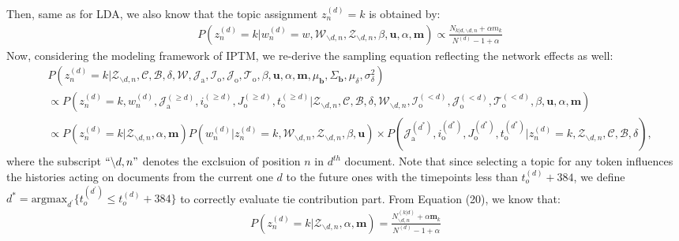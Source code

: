 \documentclass[a4paper]{article}
\begin{document}
     Then, same as for LDA, we also know that the topic assignment $z_n^{(d)}=k$ is obtained by:
     \begin{equation*}
     \begin{aligned}
     &P(z^{(d)}_n=k|w^{(d)}_n=w, \mathcal{W}_{\backslash d, n}, \mathcal{Z}_{\backslash d,n}, \beta, \boldsymbol{u}, \alpha, \boldsymbol{m}) \propto
     \frac{N_{k|d, \backslash d, n}+\alpha m_k}{N^{(d)}-1+\alpha}
     \end{aligned}
     \end{equation*}
     Now, considering the modeling framework of IPTM, we re-derive the sampling equation reflecting the network effects as well:
   \begin{equation}
   \begin{aligned} & 
   P(z^{(d)}_n=k|\mathcal{Z}_{\backslash d, n},   \mathcal{C},   \mathcal{B}, \delta, \mathcal{W},  \mathcal{J}_{\mbox{a}}, \mathcal{I}_{\mbox{o}}, \mathcal{J}_{\mbox{o}}, \mathcal{T}_{\mbox{o}}, \beta, \boldsymbol{u}, \alpha, \boldsymbol{m},  \mu_{\boldsymbol{b}}, \Sigma_{\boldsymbol{b}}, \mu_\delta, \sigma^2_\delta)\\
   & \propto P(z^{(d)}_n=k, w^{(d)}_n, \mathcal{J}^{(\geq d)}_{\mbox{a}}, i^{(\geq d)}_{\mbox{o}}, J^{(\geq d)}_{\mbox{o}}, t^{(\geq d)}_{\mbox{o}}|\mathcal{Z}_{\backslash d, n}, \mathcal{C},   \mathcal{B},\delta,\mathcal{W}_{\backslash d, n}, \mathcal{I}^{(<d)}_{\mbox{o}}, \mathcal{J}^{(<d)}_{\mbox{o}}, \mathcal{T}^{(<d)}_{\mbox{o}}, \beta, \boldsymbol{u}, \alpha, \boldsymbol{m})\\
   &\propto P(z^{(d)}_n=k|\mathcal{Z}_{\backslash d, n}, \alpha, \boldsymbol{m})P(w^{(d)}_n|z^{(d)}_n=k, \mathcal{W}_{\backslash d, n}, \mathcal{Z}_{\backslash d, n}, \beta, \boldsymbol{u} )\times P(\mathcal{J}^{(d ^*)}_{\mbox{a}}, i^{(d^*)}_{\mbox{o}}, J^{(d^*)}_{\mbox{o}}, t^{(d^*)}_{\mbox{o}}| z^{(d)}_n=k, \mathcal{Z}_{\backslash d, n}, \mathcal{C}, \mathcal{B}, \delta),
   \end{aligned}
   \end{equation}
   where the subscript $``{\backslash d, n}"$ denotes the exclsuion of position $n$ in $d^{th}$ document. Note that since selecting a topic for any token influences the histories acting on documents from the current one $d$ to the future ones with the timepoints less than $t_o^{(d)}+384$, we define $d^*=\mbox{argmax}_{d^\prime} \{t_o^{(d^\prime)} \leq t_o^{(d)}+384\}$ to correctly evaluate tie contribution part. From Equation (20), we know that:
   \begin{equation}
   \begin{aligned} 
   P(z^{(d)}_n=k|\mathcal{Z}_{\backslash d, n}, \alpha, \boldsymbol{m})=\frac{N^{(k|d)}_{\backslash d, n}+\alpha \boldsymbol{m}_k}{N^{(d)}-1+\alpha}
   \end{aligned}
   \end{equation}
\end{document}
